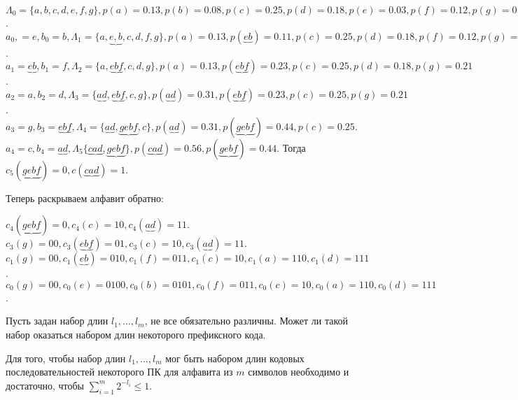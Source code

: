 	\begin{Example}
		$\Lambda_0 = \{a, b, c, d, e, f, g\}, p(a) = 0.13, p(b) = 0.08, p(c) = 0.25, p(d) = 0.18, p(e) = 0.03, p(f) = 0.12, p(g) = 0.21$. \\
		$a_0, = e, b_0 = b, \Lambda_1 = \{a, \underbrace{e, b}, c, d, f, g\}, p(a) = 0.13, p(\underbrace{eb}) = 0.11, p(c) = 0.25, p(d) = 0.18, p(f) = 0.12, p(g) = 0.21$. \\
		$a_1 = \underbrace{eb}, b_1 = f, \Lambda_2 = \{a, \underbrace{ebf}, c, d, g\}, p(a) = 0.13, p(\underbrace{ebf}) = 0.23, p(c) = 0.25, p(d) = 0.18, p(g) = 0.21$. \\ 
		$a_2 = a, b_2 = d, \Lambda_3 = \{\underbrace{ad}, \underbrace{ebf}, c, g\}, p(\underbrace{ad}) = 0.31, p(\underbrace{ebf}) = 0.23, p(c) = 0.25, p(g) = 0.21$. \\
		$a_3 = g, b_3 = \underbrace{ebf}, \Lambda_4 = \{\underbrace{ad}, \underbrace{gebf}, c\}, p(\underbrace{ad}) = 0.31, p(\underbrace{gebf}) = 0.44, p(c) = 0.25$.
		$a_4 = c, b_4 = \underbrace{ad}, \Lambda_5 \{\underbrace{cad}, \underbrace{gebf}\}, p(\underbrace{cad}) = 0.56, p(\underbrace{gebf}) = 0.44$.
		Тогда $c_5(\underbrace{gebf}) = 0, c(\underbrace{cad}) = 1$.
		
		Теперь раскрываем алфавит обратно:
		
		$c_4 (\underbrace{gebf}) = 0, c_4(c) = 10, c_4(\underbrace{ad}) = 11$. \\
		$c_3(g) = 00, c_3(\underbrace{ebf}) = 01, c_3(c) = 10, c_3(\underbrace{ad}) = 11$. \\
		$c_1(g) = 00, c_1(\underbrace{eb}) = 010, c_1(f) = 011, c_1(c) = 10, c_1(a) = 110, c_1(d) = 111$. \\
		$c_0(g) = 00, c_0(e) = 0100, c_0(b) = 0101, c_0(f) = 011, c_0(c) = 10, c_0(a) = 110, c_0(d) = 111$.
		
	\end{Example}


	Пусть задан набор длин $l_1, ..., l_m$, не все обязательно различны. Может ли такой набор оказаться набором длин некоторого префиксного кода.

	\begin{Thm}
		Для того, чтобы набор длин $l_1, ..., l_m$ мог быть набором длин кодовых последовательностей некоторого ПК для алфавита из $m$ символов необходимо и достаточно, чтобы $\sum_{i = 1}^m 2^{-l_i} \leqslant 1$. 
	\end{Thm}
